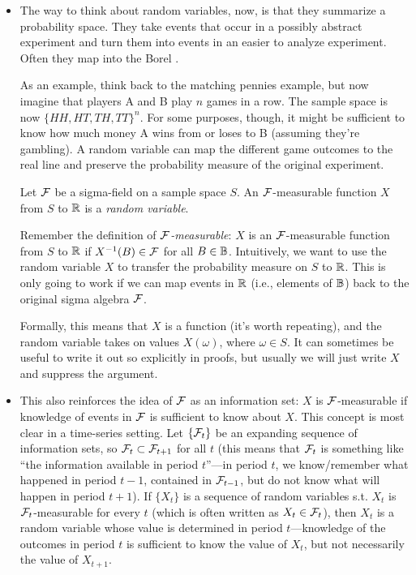 \begin{itemize}
\item The way to think about random variables, now, is that they
  summarize a probability space.  They take events that occur in a
  possibly abstract experiment and turn them into events in an easier
  to analyze experiment.  Often they map into the Borel \sigmafield.

  As an example, think back to the matching pennies example, but now
  imagine that players A and B play $n$ games in a row.  The sample
  space is now $\{HH, HT, TH, TT\}^n$.  For some purposes, though, it
  might be sufficient to know how much money A wins from or loses to B
  (assuming they're gambling).  A random variable can map the
  different game outcomes to the real line and preserve the
  probability measure of the original experiment.

  \begin{defn} Let $\mathcal{F}$ be a sigma-field on a sample space $S$.  An
  $\mathcal{F}$-measurable function $X$ from $S$ to $\mathbb{R}$ is a \emph{random
  variable}.
  \end{defn}

  Remember the definition of \emph{$\mathcal{F}$-measurable}: $X$ is an
  $\mathcal{F}$-measurable function from $S$ to $\mathbb{R}$ if $X^{-1}(B) \in \mathcal{F}$ for
  all $B \in \mathbb{B}$.  Intuitively, we want to use the random variable $X$
  to transfer the probability measure on $S$ to $\mathbb{R}$.  This is only
  going to work if we can map events in $\mathbb{R}$ (i.e., elements of
  $\mathbb{B}$) back to the original sigma algebra $\mathcal{F}$.

  Formally, this means that $X$ is a function (it's worth repeating),
  and the random variable takes on values $X(\omega)$, where $\omega
  \in S$.  It can sometimes be useful to write it out so explicitly in
  proofs, but usually we will just write $X$ and suppress the
  argument.

\item This also reinforces the idea of $\mathcal{F}$ as an information set:
  $X$ is $\mathcal{F}$-measurable if knowledge of events in $\mathcal{F}$ is
  sufficient to know about $X$.  This concept is most clear in a
  time-series setting.  Let $\{\mathcal{F}_t\}$ be an expanding sequence of
  information sets, so $\mathcal{F}_t \subset \mathcal{F}_{t+1}$ for all $t$ (this means
  that $\mathcal{F}_t$ is something like ``the information available in period
  $t$''---in period $t$, we know/remember what happened in period $t-1$,
  contained in $\mathcal{F}_{t-1}$, but do not know what will happen in period
  $t+1$).  If $\{X_t\}$ is a sequence of random variables s.t. $X_t$ is
  $\mathcal{F}_t$-measurable for every $t$ (which is often written as $X_t \in
  \mathcal{F}_t$), then $X_t$ is a random variable whose value is determined
  in period $t$---knowledge of the outcomes in period $t$ is sufficient
  to know the value of $X_t$, but not necessarily the value of
  $X_{t+1}$.


\end{itemize}
